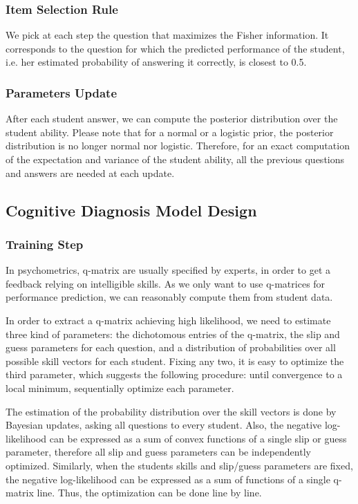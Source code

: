 \documentclass{edm_template}
\begin{document}
\subsubsection{Item Selection Rule}

We pick at each step the question that maximizes the Fisher information. It corresponds to the question for which the predicted performance of the student, i.e. her estimated probability of answering it correctly, is closest to 0.5. %

\subsubsection{Parameters Update}

After each student answer, we can compute the posterior distribution over the student ability. Please note that for a normal or a logistic prior, the posterior distribution is no longer normal nor logistic. Therefore, for an exact computation of the expectation and variance of the student ability, all the previous questions and answers are needed at each update.

\subsection{Cognitive Diagnosis Model Design}

\subsubsection{Training Step}

In psychometrics, q-matrix are usually specified by experts, in order to get a feedback relying on intelligible skills. As we only want to use q-matrices for performance prediction, we can reasonably compute them from student data.

In order to extract a q-matrix achieving high likelihood, we need to estimate three kind of parameters: the dichotomous entries of the q-matrix, the slip and guess parameters for each question, and a distribution of probabilities over all possible skill vectors for each student. Fixing any two, it is easy to optimize the third parameter, which suggests the following procedure: until convergence to a local minimum, sequentially optimize each parameter.

The estimation of the probability distribution over the skill vectors is done by Bayesian updates, asking all questions to every student. Also, the negative log-likelihood can be expressed as a sum of convex functions of a single slip or guess parameter, therefore all slip and guess parameters can be independently optimized.  Similarly, when the students skills and slip/guess parameters are fixed, the negative log-likelihood can be expressed as a sum of functions of a single q-matrix line. Thus, the optimization can be done line by line. %
\end{document}
